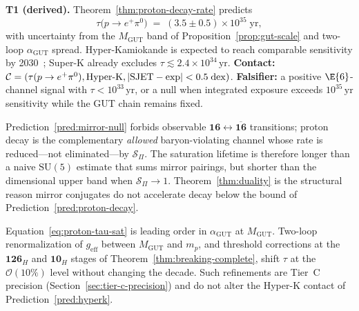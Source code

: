 \begin{prediction}\label{pred:hyperk}
\textbf{T1 (derived).} Theorem~\ref{thm:proton-decay-rate} predicts
\begin{equation}\label{eq:hyperk-target}
  \tau\!\bigl(p\to e^+\pi^0\bigr)
  \;=\;
  (3.5\pm 0.5)\times 10^{35}\;\mathrm{yr},
\end{equation}
with uncertainty from the $M_{\mathrm{GUT}}$ band of
Proposition~\ref{prop:gut-scale} and two-loop $\alpha_{\mathrm{GUT}}$ spread.
Hyper-Kamiokande is expected to reach comparable sensitivity by
2030~\cite{SuperK2020}; Super-K already excludes $\tau\lesssim 2.4\times
10^{34}\,\mathrm{yr}$. \textbf{Contact:}
$\mathcal{C}=(\tau(p\to e^+\pi^0),\mathrm{Hyper\text{-}K},
|{\rm SJET}-{\rm exp}|<0.5\;\mathrm{dex})$.
\textbf{Falsifier:} a positive $\E{6}$-channel signal with
$\tau<10^{33}\,\mathrm{yr}$, or a null when integrated exposure exceeds
$10^{35}\,\mathrm{yr}$ sensitivity while the GUT chain remains fixed.
\end{prediction}

\begin{remark}
Prediction~\ref{pred:mirror-null} forbids observable
$\mathbf{16}\leftrightarrow\overline{\mathbf{16}}$ transitions; proton decay is
the complementary \emph{allowed} baryon-violating channel whose rate is
reduced—not eliminated—by $\mathcal{S}_\Pi$. The saturation lifetime is
therefore longer than a naive $\mathrm{SU}(5)$ estimate that sums mirror
pairings, but shorter than the dimensional upper band when
$\mathcal{S}_\Pi\to 1$. Theorem~\ref{thm:duality} is the structural reason
mirror conjugates do not accelerate decay below the bound of
Prediction~\ref{pred:proton-decay}.
\end{remark}

\begin{remark}
Equation~\eqref{eq:proton-tau-sat} is leading order in $\alpha_{\mathrm{GUT}}$
at $M_{\mathrm{GUT}}$. Two-loop renormalization of $g_{\mathrm{eff}}$ between
$M_{\mathrm{GUT}}$ and $m_p$, and threshold corrections at the
$\mathbf{126}_H$ and $\mathbf{10}_H$ stages of
Theorem~\ref{thm:breaking-complete}, shift $\tau$ at the $\mathcal{O}(10\%)$
level without changing the decade. Such refinements are Tier~C precision
(Section~\ref{sec:tier-c-precision}) and do not alter the Hyper-K contact of
Prediction~\ref{pred:hyperk}.
\end{remark}